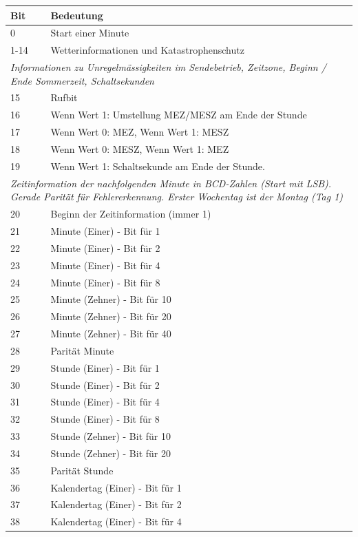 \begin{longtable}{p{0.5cm} p{13.5cm}}
\textbf{Bit} & \textbf{Bedeutung} \\ \hline \endhead
0 & Start einer Minute \\
1-14 & Wetterinformationen und Katastrophenschutz \\ \hline
\multicolumn{2}{p{14cm}}{\textit{Informationen zu Unregelmässigkeiten im Sendebetrieb, Zeitzone, Beginn / Ende Sommerzeit, Schaltsekunden}}  \\ \hline
15 & Rufbit \\
16 & Wenn Wert 1: Umstellung MEZ/MESZ am Ende der Stunde \\
17 & Wenn Wert 0: MEZ, Wenn Wert 1: MESZ \\
18 & Wenn Wert 0: MESZ, Wenn Wert 1: MEZ \\
19 & Wenn Wert 1: Schaltsekunde am Ende der Stunde. \\ \hline
\multicolumn{2}{p{14cm}}{\textit{Zeitinformation der nachfolgenden Minute in BCD-Zahlen (Start mit LSB). Gerade Parität für Fehlererkennung. Erster Wochentag ist der Montag (Tag 1)}}  \\ \hline
20 & Beginn der Zeitinformation (immer 1) \\
21 & Minute (Einer) - Bit für 1 \\
22 & Minute (Einer) - Bit für 2 \\
23 & Minute (Einer) - Bit für 4 \\
24 & Minute (Einer) - Bit für 8 \\
25 & Minute (Zehner) - Bit für 10 \\
26 & Minute (Zehner) - Bit für 20 \\
27 & Minute (Zehner) - Bit für 40 \\
28 & Parität Minute \\ \hline
29 & Stunde (Einer) - Bit für 1 \\
30 & Stunde (Einer) - Bit für 2 \\
31 & Stunde (Einer) - Bit für 4 \\
32 & Stunde (Einer) - Bit für 8 \\
33 & Stunde (Zehner) - Bit für 10 \\
34 & Stunde (Zehner) - Bit für 20 \\
35 & Parität Stunde \\ \hline
36 & Kalendertag (Einer) - Bit für 1 \\
37 & Kalendertag (Einer) - Bit für 2 \\
38 & Kalendertag (Einer) - Bit für 4 \\

\end{longtable}
